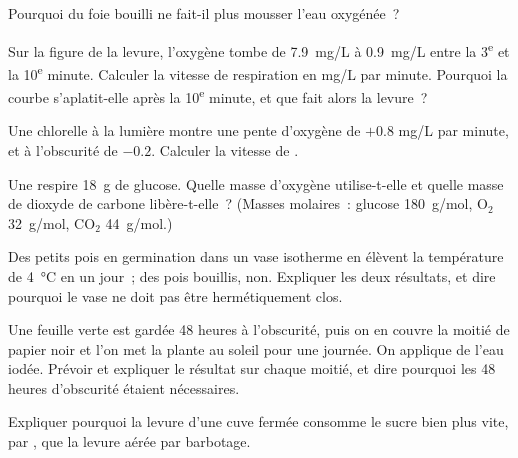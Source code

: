 \begin{exercise}[$\star$]\label{exo:g10:cell-metabolism:5}
Pourquoi du foie bouilli ne fait-il plus mousser l'eau oxygénée~?
\end{exercise}

\begin{exercise}[$\star\star$]\label{exo:g10:cell-metabolism:6}
Sur la figure de la levure, l'oxygène tombe de \qty{7.9}{mg/L} à
\qty{0.9}{mg/L} entre la 3\textsuperscript{e} et la
10\textsuperscript{e} minute. Calculer la vitesse de respiration en
\unit{mg/L} par minute. Pourquoi la courbe s'aplatit-elle après la
10\textsuperscript{e} minute, et que fait alors la levure~?
\end{exercise}

\begin{exercise}[$\star\star$]\label{exo:g10:cell-metabolism:7}
Une chlorelle à la lumière montre une pente d'oxygène de $+0.8$
\unit{mg/L} par minute, et à l'obscurité de $-0.2$. Calculer la vitesse
de .
\end{exercise}

\begin{exercise}[$\star\star$]\label{exo:g10:cell-metabolism:8}
Une  respire \qty{18}{g} de glucose. Quelle masse d'oxygène
utilise-t-elle et quelle masse de dioxyde de carbone libère-t-elle~?
(Masses molaires~: glucose \qty{180}{g/mol}, $\mathrm{O_2}$
\qty{32}{g/mol}, $\mathrm{CO_2}$ \qty{44}{g/mol}.)
\end{exercise}

\begin{exercise}[$\star\star$]\label{exo:g10:cell-metabolism:9}
Des petits pois en germination dans un vase isotherme en élèvent la
température de \qty{4}{\celsius} en un jour~; des pois bouillis, non.
Expliquer les deux résultats, et dire pourquoi le vase ne doit pas être
hermétiquement clos.
\end{exercise}

\begin{exercise}[$\star\star$]\label{exo:g10:cell-metabolism:10}
Une feuille verte est gardée 48 heures à l'obscurité, puis on en couvre
la moitié de papier noir et l'on met la plante au soleil pour une
journée. On applique de l'eau iodée. Prévoir et expliquer le résultat
sur chaque moitié, et dire pourquoi les 48 heures d'obscurité étaient
nécessaires.
\end{exercise}

\begin{exercise}[$\star\star$]\label{exo:g10:cell-metabolism:11}
Expliquer pourquoi la levure d'une cuve fermée consomme le sucre bien
plus vite, par , que la levure aérée par barbotage.
\end{exercise}

